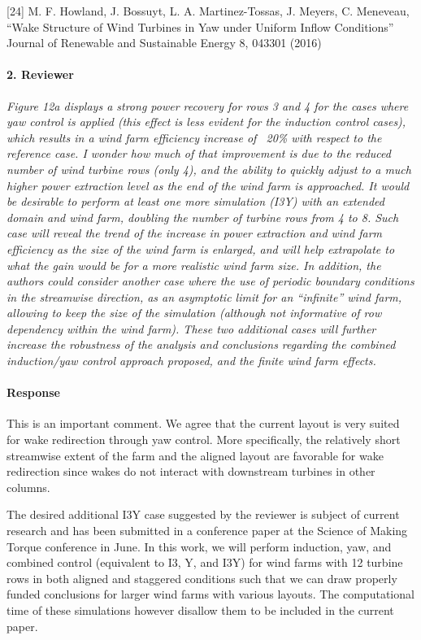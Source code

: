 \documentclass[]{article}
\begin{document}
[24] M. F. Howland, J. Bossuyt, L. A. Martinez-Tossas, J. Meyers, C. Meneveau, ``Wake Structure of Wind Turbines in Yaw under Uniform Inflow Conditions'' Journal of Renewable and Sustainable Energy 8, 043301 (2016)

\hrulefill 

\paragraph{2. Reviewer} \textit{Figure 12a displays a strong power recovery for rows 3 and 4 for the cases where yaw control is applied (this effect is less evident for the induction control cases), which results in a wind farm efficiency increase of ~20\% with respect to the reference case. I wonder how much of that improvement is due to the reduced number of wind turbine rows (only 4), and the ability to quickly adjust to a much higher power extraction level as the end of the wind farm is approached. It would be desirable to perform at least one more simulation (I3Y) with an extended domain and wind farm, doubling the number of turbine rows from 4 to 8. Such case will reveal the trend of the increase in power extraction and wind farm efficiency as the size of the wind farm is enlarged, and will help extrapolate to what the gain would be for a more realistic wind farm size. In addition, the authors could consider another case where the use of periodic boundary conditions in the streamwise direction, as an asymptotic limit for an “infinite” wind farm, allowing to keep the size of the simulation (although not informative of row dependency within the wind farm). These two additional cases will further increase the robustness of the analysis and conclusions regarding the combined induction/yaw control approach proposed, and the finite wind farm effects.}

\paragraph{Response} This is an important comment. We agree that the current layout is very suited for wake redirection through yaw control. More specifically, the relatively short streamwise extent of the farm and the aligned layout are favorable for wake redirection since wakes do not interact with downstream turbines in other columns. 

The desired additional I3Y case suggested by the reviewer is subject of current research and has been submitted in a conference paper at the Science of Making Torque conference in June. In this work, we will perform induction, yaw, and combined control (equivalent to I3, Y, and I3Y) for wind farms with 12 turbine rows in both aligned and staggered conditions such that we can draw properly funded conclusions for larger wind farms with various layouts. The computational time of these simulations however disallow them to be included in the current paper. 
\end{document}
